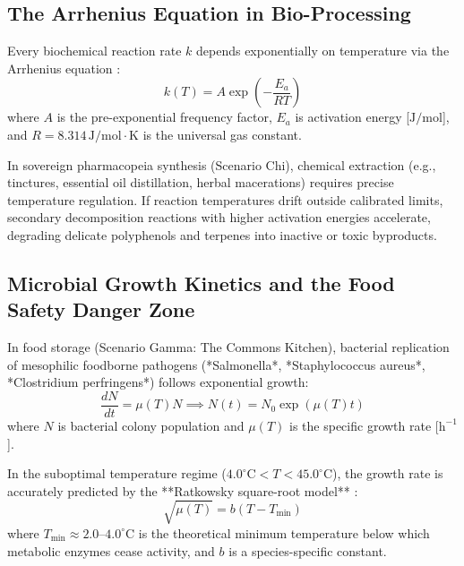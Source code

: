\subsection{The Arrhenius Equation in Bio-Processing}

Every biochemical reaction rate $k$ depends exponentially on temperature via the Arrhenius equation \cite{laidler1987chemical}:
\begin{equation}
k(T) = A \exp\left( -\frac{E_a}{R T} \right)
\label{eq:arrhenius_general}
\end{equation}
where $A$ is the pre-exponential frequency factor, $E_a$ is activation energy [$\mathrm{J/mol}$], and $R = 8.314\,\mathrm{J/mol\cdot K}$ is the universal gas constant.

In sovereign pharmacopeia synthesis (Scenario Chi), chemical extraction (e.g., tinctures, essential oil distillation, herbal macerations) requires precise temperature regulation. If reaction temperatures drift outside calibrated limits, secondary decomposition reactions with higher activation energies accelerate, degrading delicate polyphenols and terpenes into inactive or toxic byproducts.

\subsection{Microbial Growth Kinetics and the Food Safety Danger Zone}

In food storage (Scenario Gamma: The Commons Kitchen), bacterial replication of mesophilic foodborne pathogens (*Salmonella*, *Staphylococcus aureus*, *Clostridium perfringens*) follows exponential growth:
\begin{equation}
\frac{dN}{dt} = \mu(T) N \implies N(t) = N_0 \exp\left( \mu(T) t \right)
\label{eq:microbial_growth}
\end{equation}
where $N$ is bacterial colony population and $\mu(T)$ is the specific growth rate [$\mathrm{h^{-1}}$].

In the suboptimal temperature regime ($4.0^\circ\mathrm{C} < T < 45.0^\circ\mathrm{C}$), the growth rate is accurately predicted by the **Ratkowsky square-root model** \cite{ratkowsky1982relationship}:
\begin{equation}
\sqrt{\mu(T)} = b (T - T_{\min})
\label{eq:ratkowsky_model}
\end{equation}
where $T_{\min} \approx 2.0$--$4.0^\circ\mathrm{C}$ is the theoretical minimum temperature below which metabolic enzymes cease activity, and $b$ is a species-specific constant.

